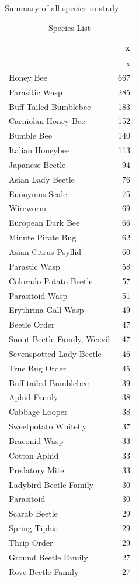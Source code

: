 \documentclass[
  12pt,
]{article}
\begin{document}
Summary of all species in study

\begin{longtable}[]{@{}lr@{}}
\caption{Species List}\tabularnewline
\toprule
& x \\
\midrule
\endfirsthead
\toprule
& x \\
\midrule
\endhead
Honey Bee & 667 \\
Parasitic Wasp & 285 \\
Buff Tailed Bumblebee & 183 \\
Carniolan Honey Bee & 152 \\
Bumble Bee & 140 \\
Italian Honeybee & 113 \\
Japanese Beetle & 94 \\
Asian Lady Beetle & 76 \\
Euonymus Scale & 75 \\
Wireworm & 69 \\
European Dark Bee & 66 \\
Minute Pirate Bug & 62 \\
Asian Citrus Psyllid & 60 \\
Parastic Wasp & 58 \\
Colorado Potato Beetle & 57 \\
Parasitoid Wasp & 51 \\
Erythrina Gall Wasp & 49 \\
Beetle Order & 47 \\
Snout Beetle Family, Weevil & 47 \\
Sevenspotted Lady Beetle & 46 \\
True Bug Order & 45 \\
Buff-tailed Bumblebee & 39 \\
Aphid Family & 38 \\
Cabbage Looper & 38 \\
Sweetpotato Whitefly & 37 \\
Braconid Wasp & 33 \\
Cotton Aphid & 33 \\
Predatory Mite & 33 \\
Ladybird Beetle Family & 30 \\
Parasitoid & 30 \\
Scarab Beetle & 29 \\
Spring Tiphia & 29 \\
Thrip Order & 29 \\
Ground Beetle Family & 27 \\
Rove Beetle Family & 27 \\

\end{longtable}
\end{document}
